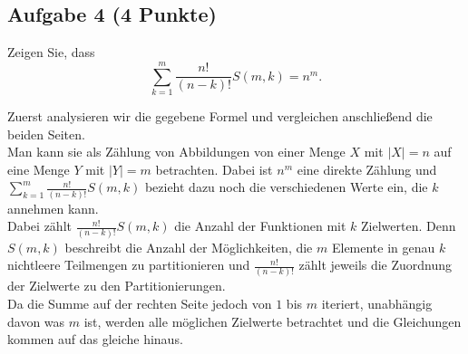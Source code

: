 \documentclass{article} %
\begin{document}
\subsection*{Aufgabe 4 (4 Punkte)}
Zeigen Sie, dass 
\[
\sum_{k=1}^{m} \frac{n!}{(n - k)!} S(m, k) = n^m.
\]
\begin{mybox}
Zuerst analysieren wir die gegebene Formel und vergleichen anschließend die beiden Seiten. \\
Man kann sie als Zählung von Abbildungen von einer Menge $X$ mit $|X| = n$ auf eine Menge $Y$ mit $|Y| = m$ betrachten. Dabei ist $n^m$ eine direkte Zählung und $\sum_{k=1}^{m} \frac{n!}{(n - k)!} S(m, k)$ bezieht dazu noch die verschiedenen Werte ein, die $k$ annehmen kann. \\
Dabei zählt $\frac{n!}{(n - k)!} S(m, k)$ die Anzahl der Funktionen mit $k$ Zielwerten. Denn $S(m,k)$ beschreibt die Anzahl der Möglichkeiten, die $m$ Elemente in genau $k$ nichtleere Teilmengen zu partitionieren und $\frac{n!}{(n - k)!}$ zählt jeweils die Zuordnung der Zielwerte zu den Partitionierungen. \\
Da die Summe auf der rechten Seite jedoch von $1$ bis $m$ iteriert, unabhängig davon was $m$ ist, werden alle möglichen Zielwerte betrachtet und die Gleichungen kommen auf das gleiche hinaus. 
\end{mybox}
\color{Blue}
\printbibliography
\end{document}
